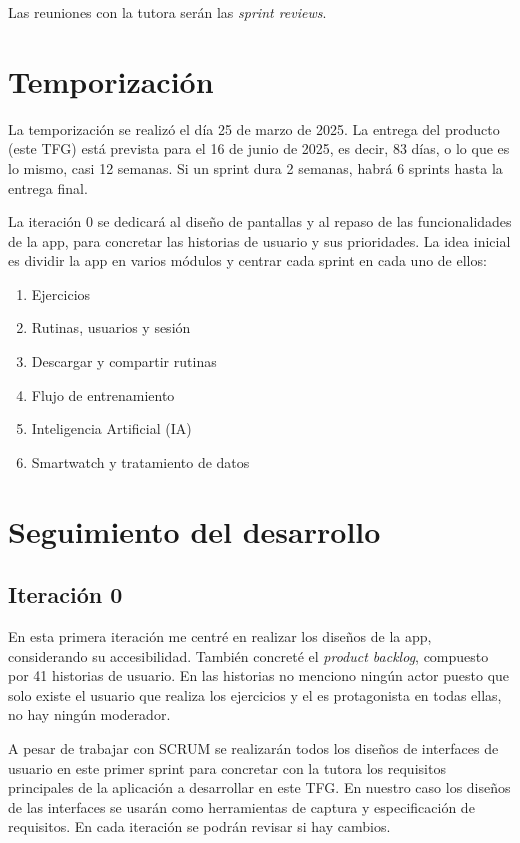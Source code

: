 Las reuniones con la tutora serán las \textit{sprint reviews}.

\section{Temporización}
La temporización se realizó el día 25 de marzo de 2025. La entrega del producto (este TFG) está prevista para el 16 de junio de 2025, es decir, 83 días, o lo que es lo mismo, casi 12 semanas. Si un sprint dura 2 semanas, habrá 6 sprints hasta la entrega final.

La iteración 0 se dedicará al diseño de pantallas y al repaso de las funcionalidades de la app, para concretar las historias de usuario y sus prioridades. La idea inicial es dividir la app en varios módulos y centrar cada sprint en cada uno de ellos:

\begin{enumerate}
  \item Ejercicios
  \item Rutinas, usuarios y sesión
  \item Descargar y compartir rutinas
  \item Flujo de entrenamiento
  \item Inteligencia Artificial (IA)
  \item Smartwatch y tratamiento de datos
\end{enumerate}

\section{Seguimiento del desarrollo}

\subsection{Iteración 0}
En esta primera iteración me centré en realizar los diseños de la app, considerando su accesibilidad. También concreté el \textit{product backlog}, compuesto por 41 historias de usuario. En las historias no menciono ningún actor puesto que solo existe el usuario que realiza los ejercicios y el es protagonista en todas ellas, no hay ningún moderador.

A pesar de trabajar con SCRUM se realizarán todos los diseños de interfaces de usuario en este primer sprint para concretar con la tutora los requisitos principales de la aplicación a desarrollar en este TFG. En nuestro caso los diseños de las interfaces se usarán como herramientas de captura y especificación de requisitos. En cada iteración se podrán revisar si hay cambios. 

